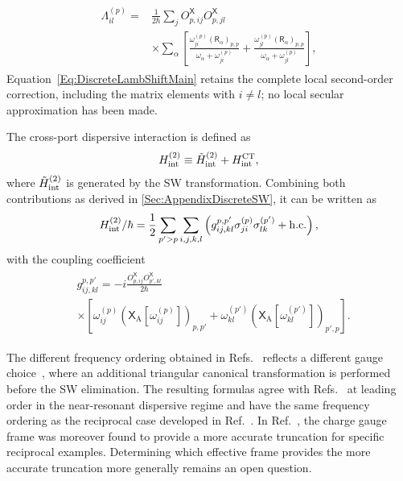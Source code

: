 \documentclass[prx,aps,twocolumn,article]{revtex4-2}
\newcommand{\msf}[1]{\mathsf{#1}}
\newcommand{\hc}{\mathrm{h.c.}}
\newcommand{\msXA}{\msX_\mathrm{A}}
\newcommand{\msX}{\msf{X}}
\newcommand{\msR}{\msf{R}}
\begin{document}
\begin{align}
\begin{aligned}
    \Lambda_{il}^{(p)}
    ={}&
    \frac{1}{2\hbar}
    \sum_j
    O_{p,ij}^{\msX}
    O_{p,jl}^{\msX}
    \\
    &\times \sum_\alpha
    \left[
        \frac{\omega_{ji}^{(p)}(\msR_\alpha)_{p,p}}{\omega_\alpha+ \omega_{ji}^{(p)}}+ \frac{\omega_{jl}^{(p)}(\msR_\alpha)_{p,p}}{\omega_\alpha+ \omega_{jl}^{(p)}}
    \right],
\end{aligned}
\label{Eq:DiscreteLambShiftCoefficientMain}
\end{align}
Equation~\eqref{Eq:DiscreteLambShiftMain} retains the complete local second-order correction, including the matrix elements with $i\neq l$; no local secular approximation has been made.

The cross-port dispersive interaction is defined as
\begin{align}
    H_{\rm int}^{(2)}
    \equiv
    \tilde{H}_{\rm int}^{(2)}
    +
    H_{\mathrm{int}}^{\mathrm{CT}},
\end{align}
where $\tilde{H}_{\rm int}^{(2)}$ is generated by the SW transformation. Combining both contributions as derived in \cref{Sec:AppendixDiscreteSW}, it can be written as
\begin{align}
    H_{\rm int}^{(2)}/\hbar
    =
    \frac{1}{2}
    \sum_{p'>p}
    \sum_{i,j,k,l}
    \left(
        g_{ij,kl}^{p,p'}
        \sigma_{ji}^{(p)}
        \sigma_{lk}^{(p')}
        +
        \hc
    \right),
\label{Eq:DiscreteInteractionMain}
\end{align}
with the coupling coefficient
\begin{align}
\begin{aligned}
&g_{ij,kl}^{p,p'} = -i\frac{ O_{p,ij}^{\msX} O_{p',kl}^{\msX}}{2\hbar}
    \\
    &\times
    \left[
        \omega_{ij}^{(p)}
        \left(
            \msXA
            \left[
                \omega_{ij}^{(p)}
            \right]
        \right)_{p,p'}
        +
        \omega_{kl}^{(p')}
        \left(
            \msXA
            \left[
                \omega_{kl}^{(p')}
            \right]
        \right)_{p',p}
    \right].
\end{aligned}
\label{Eq:DiscreteGeneralCouplingMain}
\end{align}

The different frequency ordering obtained in Refs.~\cite{Solgun:2019,Labarca:2024} reflects a different gauge choice~\cite{Manucharyan:2017,DeBernardis:2018,Roth:2019,Stokes:2019,DiStefano:2019,Mehta:2022,Arwas:2023}, where an additional triangular canonical transformation is performed before the SW elimination. The resulting formulas agree with Refs.~\cite{Solgun:2019,Labarca:2024} at leading order in the near-resonant dispersive regime and have the same frequency ordering as the reciprocal case developed in Ref.~\cite{Khan:2024}. In Ref.~\cite{Khan:2024}, the charge gauge frame was moreover found to provide a more accurate truncation for specific reciprocal examples. Determining which effective frame provides the more accurate truncation more generally remains an open question.
\end{document}
